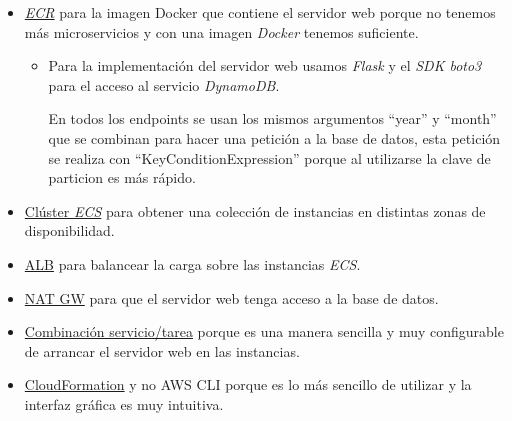 \begin{itemize}
    \item \underline{\textit{ECR}} para la imagen Docker que contiene el servidor web porque no tenemos más microservicios y con una imagen \textit{Docker} tenemos suficiente.

    \begin{itemize}
        \item Para la implementación del servidor web usamos \textit{Flask} y el \textit{SDK boto3} para el acceso al servicio \textit{DynamoDB}. 

        En todos los endpoints se usan los mismos argumentos ``year'' y ``month'' que se combinan para hacer una petición a la base de datos, esta petición se realiza con ``KeyConditionExpression'' porque al utilizarse la clave de particion es más rápido.
    \end{itemize}

    \item \underline{Clúster \textit{ECS}} para obtener una colección de instancias en distintas zonas de disponibilidad.

    \item \underline{ALB} para balancear la carga sobre las instancias \textit{ECS}.

    \item \underline{NAT GW} para que el servidor web tenga acceso a la base de datos.

    \item \underline{Combinación servicio/tarea} porque es una manera sencilla y muy configurable de arrancar el servidor web en las instancias.

    \item \underline{CloudFormation} y no AWS CLI porque es lo más sencillo de utilizar y la interfaz gráfica es muy intuitiva.
\end{itemize}
